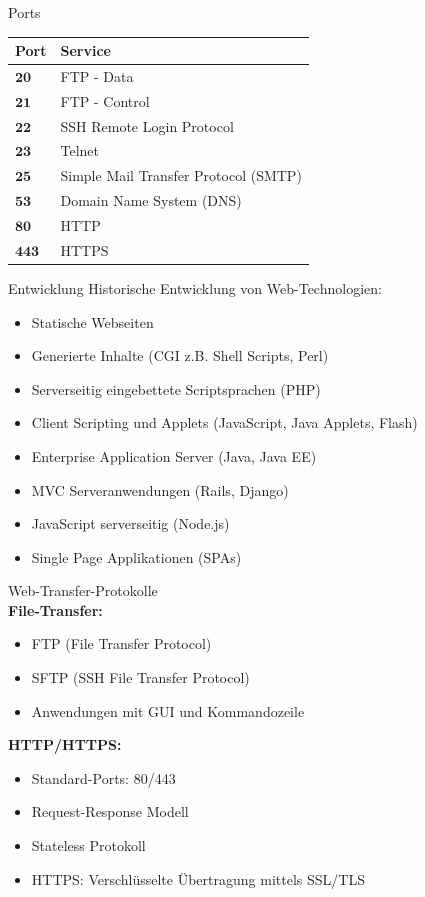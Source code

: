\begin{corollary}{Ports}
\begin{center}
\begin{tabular}{|l|l|}
\hline
Port & Service \\
\hline
$\mathbf{20}$ & FTP - Data \\
\hline
$\mathbf{21}$ & FTP - Control \\
\hline
$\mathbf{22}$ & SSH Remote Login Protocol \\
\hline
$\mathbf{23}$ & Telnet \\
\hline
$\mathbf{25}$ & Simple Mail Transfer Protocol (SMTP) \\
\hline
$\mathbf{53}$ & Domain Name System (DNS) \\
\hline
$\mathbf{80}$ & HTTP \\
\hline
$\mathbf{443}$ & HTTPS \\
\hline
\end{tabular}
\end{center}
\end{corollary}

\begin{concept}{Entwicklung}
    Historische Entwicklung von Web-Technologien:
    \begin{itemize}
        \item Statische Webseiten
        \item Generierte Inhalte (CGI z.B. Shell Scripts, Perl)
        \item Serverseitig eingebettete Scriptsprachen (PHP)
        \item Client Scripting und Applets (JavaScript, Java Applets, Flash)
        \item Enterprise Application Server (Java, Java EE)
        \item MVC Serveranwendungen (Rails, Django)
        \item JavaScript serverseitig (Node.js)
        \item Single Page Applikationen (SPAs)
    \end{itemize}
\end{concept}

\begin{definition}{Web-Transfer-Protokolle}\\
    \textbf{File-Transfer:}
    \begin{itemize}
        \item FTP (File Transfer Protocol)
        \item SFTP (SSH File Transfer Protocol)
        \item Anwendungen mit GUI und Kommandozeile
    \end{itemize}

    \textbf{HTTP/HTTPS:}
    \begin{itemize}
        \item Standard-Ports: 80/443
        \item Request-Response Modell
        \item Stateless Protokoll
        \item HTTPS: Verschlüsselte Übertragung mittels SSL/TLS
    \end{itemize}
\end{definition}

